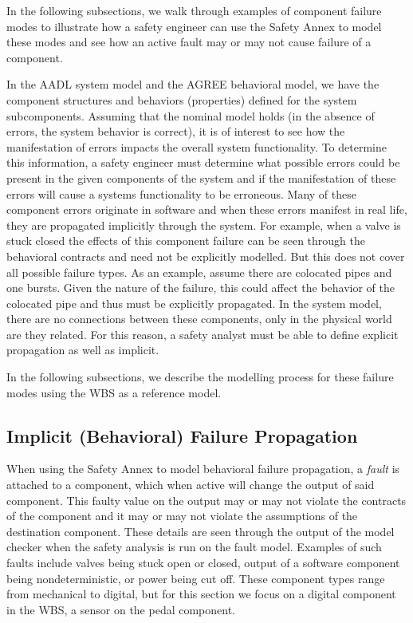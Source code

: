 In the following subsections, we walk through examples of component failure modes to illustrate how a safety engineer can use the Safety Annex to model these modes and see how an active fault may or may not cause failure of a component.

In the AADL system model and the AGREE behavioral model, we have the component structures and behaviors (properties) defined for the system subcomponents. Assuming that the nominal model holds (in the absence of errors, the system behavior is correct), it is of interest to see how the manifestation of errors impacts the overall system functionality. To determine this information, a safety engineer must determine what possible errors could be present in the given components of the system and if the manifestation of these errors will cause a systems functionality to be erroneous. Many of these component errors originate in software and when these errors manifest in real life, they are propagated implicitly through the system. For example, when a valve is stuck closed the effects of this component failure can be seen through the behavioral contracts and need not be explicitly modelled. But this does not cover all possible failure types. As an example, assume there are colocated pipes and one bursts. Given the nature of the failure, this could affect the behavior of the colocated pipe and thus must be explicitly propagated. In the system model, there are no connections between these components, only in the physical world are they related. For this reason, a safety analyst must be able to define explicit propagation as well as implicit.  

In the following subsections, we describe the modelling process for these failure modes using the WBS as a reference model. 

\subsection{Implicit (Behavioral) Failure Propagation}

When using the Safety Annex to model behavioral failure propagation, a \textit{fault} is attached to a component, which when active will change the output of said component. This faulty value on the output may or may not violate the contracts of the component and it may or may not violate the assumptions of the destination component. These details are seen through the output of the model checker when the safety analysis is run on the fault model. Examples of such faults include valves being stuck open or closed, output of a software component being nondeterministic, or power being cut off. These component types range from mechanical to digital, but for this section we focus on a digital component in the WBS, a sensor on the pedal component. 

